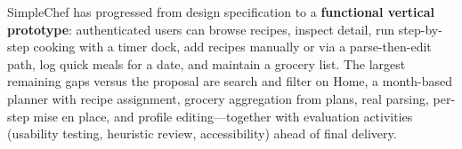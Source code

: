 SimpleChef has progressed from design specification to a \textbf{functional vertical prototype}: authenticated users can browse recipes, inspect detail, run step-by-step cooking with a timer dock, add recipes manually or via a parse-then-edit path, log quick meals for a date, and maintain a grocery list. The largest remaining gaps versus the proposal are search and filter on Home, a month-based planner with recipe assignment, grocery aggregation from plans, real parsing, per-step mise en place, and profile editing---together with evaluation activities (usability testing, heuristic review, accessibility) ahead of final delivery.
